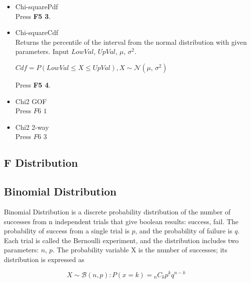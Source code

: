     \begin{equation}
        
        \label{def_Normal_Distribution}
    \end{equation}

    \begin{itemize}
        \item Chi-squarePdf\\
        
        Press \textbf{F5 3}.

        \item Chi-squareCdf\\
        Returns the percentile of the interval from the normal distribution with given parameters. Input $LowVal$, $UpVal$, $\mu$, $\sigma^{2}$.
        \begin{center}
            $Cdf = P(LowVal\leq X \leq UpVal),  X\sim \mathcal{N}(\mu,\,\sigma^{2})$
            \label{NormalCdf}
        \end{center}

        Press \textbf{F5 4}.

        \item Chi2 GOF\\

        Press $F6$ $1$

        \item Chi2 2-way\\

        Press $F6$ $3$

    \end{itemize}

\subsection{F Distribution}
\subsection{Binomial Distribution}
    Binomial Distribution is a discrete probability distribution of the number of successes from n independent trials that give boolean results: success, fail. The probability of success from a single trial is $p$, and the probability of failure is $q$. Each trial is called the Bernoulli experiment, and the distribution includes two parameters: $n$, $p$. The probability variable X is the number of successes; its distribution is expressed as

    \begin{equation}
        X \sim \mathcal{B}(n, p) : P(x = k) = {}_n C_k p^{k}q^{n-k}
        \label{def_Binomial_Distribution}
    \end{equation}

